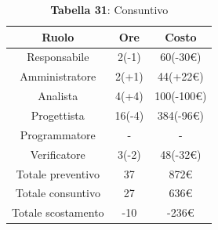 \begin{table}[H]
	\centering
	\renewcommand{\arraystretch}{1.5}
	\begin{tabular}{|c|c|c|}
		\hline
		\rowcolor{lighter-grayer}
		Ruolo & Ore & Costo \\ \hline
		Responsabile & 2(-1) & 60(-30\euro) \\ \hline
		Amministratore & 2(+1) & 44(+22\euro) \\ \hline
		Analista & 4(+4) & 100(-100\euro) \\ \hline
		Progettista & 16(-4) & 384(-96\euro) \\ \hline
		Programmatore & - & - \\ \hline
		Verificatore & 3(-2) & 48(-32\euro) \\ \hline
		Totale preventivo & 37 & 872\euro \\ \hline
		Totale consuntivo & 27 & 636\euro \\ \hline
		Totale scostamento & -10 & -236\euro \\ \hline
	\end{tabular}
	\caption*{\textbf{Tabella 31}: Consuntivo\\}
\end{table}

